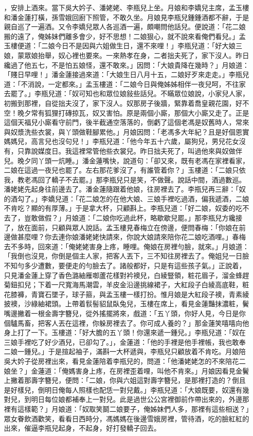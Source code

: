 \begin{showcontents}{}
，安排上酒來。當下吳大妗子、潘姥姥、李瓶兒上坐。月娘和李嬌兒主席，孟玉樓和潘金蓮打橫，孫雪娥回廚下照管，不敢久坐。月娘見李瓶兒鍾鍾酒都不辭，于是親自巡了一遍酒。又令李嬌兒眾人各巡酒一遍，頗嘲問他話兒。便說道：「花二娘搬的遠了，俺姊妹們離多會少，好不思想！二娘狠心，就不說來看俺們看兒。」孟玉樓便道：「二娘今日不是因與六姐做生日，還不來哩！」李瓶兒道：「好大娘三娘，蒙眾娘抬舉，奴心裡也要來。一來熱孝在身，二者拙夫死了，家下沒人。昨日纔過了他五七，不是怕五娘怪，還不敢來。」因問：「大娘貴降在幾時？」月娘道：「賤日早哩！」潘金蓮接過來道：「大娘生日八月十五，二娘好歹來走走。」李瓶兒道：「不消說，一定都來。」孟玉樓道：「二娘今日與俺姊姊相伴一夜兒呵，不往家去罷了。」李瓶兒道：「奴可知也和眾位娘敍些話兒。不瞞眾位娘說，小家兒人家，初搬到那裡，自從拙夫沒了，家下沒人。奴那房子後牆，緊靠着喬皇親花園，好不空！晚夕常有狐狸打磚掠瓦，奴又害怕。原是兩個小廝，那個大小廝又走了。正是這個天福兒小廝看守前門，後半截通空落落的，倒虧了這個老馮是奴舊時人，常來與奴漿洗些衣裳，與丫頭做鞋腳累他。」月娘因問：「老馮多大年紀？且是好個恩實媽媽兒，高言兒也沒句兒！」李瓶兒道：「他今年五十六歲，屬狗兒，男兒花女沒有，只靠說媒度日。我這裡常管他些衣裳兒。昨日拙夫死了，叫過他來與奴做伴兒。晚夕同丫頭一炕睡。」潘金蓮嘴快，說道句：「卻又來，既有老馮在家裡看家，二娘在這過一夜兒也罷了。左右那花爹沒了，有誰管着你？」玉樓道：「二娘只依我，教老馮回了轎子不去罷。」那李瓶兒只是笑，不做聲。說話中間，酒過數巡。潘姥姥先起身往前邊去了。潘金蓮隨跟着他娘，往房裡去了。李瓶兒再三辭：「奴的酒勾了。」李嬌兒道：「花二娘怎的在他大娘、三娘手裡吃過酒，偏我遞酒，二娘不肯吃？顯的有厚薄。」于是拿大杯，只顧斟上。李瓶兒道：「好二娘，奴委的吃不去了，豈敢做假？」月娘道：「二娘你吃過此杯，略歇歇兒罷。」那李瓶兒方纔接了，放在面前，只顧與眾人說話。孟玉樓見春梅立在傍邊，便問春梅：「你娘在前邊做甚麼哩？你去連你娘潘姥姥快請來，你說大娘請來陪你花二娘吃酒哩。」春梅去不多時，回來道：「俺姥姥害身上疼，睡哩。俺娘在房裡勻臉，就來。」月娘道：「我倒也沒見，你倒是個主人家，把客人丟下，三不知往房裡去了。俺姐兒一日臉不知勻多少遭數，要便走的勻臉去了。諸般都好，只是有這些孩子氣。」正說着，只見潘金蓮上穿了香色潞紬雁啣蘆花樣對衿襖兒，白綾豎領，粧花眉子，溜金蜂趕菊鈕扣兒；下着一尺寬海馬潮雲，羊皮金沿邊挑線裙子，大紅段子白綾高底鞋，粧花膝褲，青寶石墜子，球子箍，與孟玉樓一樣打扮。惟月娘是大紅段子襖，青素綾披襖，沙綠紬裙頭。上帶着䯼髻貂鼠臥兔兒，玉樓在席上，看見金蓮豔抹濃粧，鬢嘴邊撇着一根金壽字簪兒，從外搖擺將來，戲道：「五丫頭，你好人見，今日是你個驢馬畜，把客人丟在這裡，你躲房裡去了。你可成人養的？」那金蓮笑嘻嘻向他身上打了一下。玉樓道：「好大膽的五丫頭！你還來遞一鍾兒。」李瓶兒道：「奴在三娘手裡吃了好少酒兒，已卻勾了。」，金蓮道：「他的手裡是他手裡帳，我也敢奉二娘一鍾兒。」于是揎起袖子，滿斟一大杯遞與，李瓶兒只顧放着不肯吃。月娘陪吳大妗子從房裡出來，看見金蓮陪着李瓶兒的，問道：「他潘姥姥怎的不來陪花二娘坐？」金蓮道：「俺媽害身上疼，在房裡歪着哩，叫他不肯來。」月娘因看見金鬢上撇着那壽字簪兒，便問：「二娘，你與六姐這對壽字簪兒，是那裡打造的？倒且是好樣兒，倒明日俺每人照樣也配恁一對兒戴。」李瓶兒道：「大娘既要，奴還有幾對兒，到明日每位娘都補奉上一對兒。此是過世公公宮裡御前作帶出來的，外邊那裡有這樣範？」月娘道：「奴取笑鬬二娘要子，俺姊妹們人多，那裡有這些相送？」眾女眷飲酒歡笑，看看日西時分，馮媽媽在後邊雪娥房裡，管待酒，吃的臉紅紅的出來，催逼李瓶兒起身，不起身，好打發轎子回去。
\end{showcontents}
